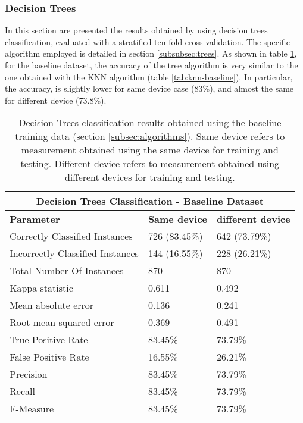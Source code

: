 \subsubsection{Decision Trees}
\label{test-trees}
In this section are presented the results obtained by using decision trees classification, evaluated with a stratified ten-fold cross validation. The specific algorithm employed is detailed in section \ref{subsubsec:trees}. As shown in table \ref{tab:tree-baseline}, for the baseline dataset, the accuracy of the tree algorithm is very similar to the one obtained with the KNN algorithm (table \ref{tab:knn-baseline}). In particular, the accuracy, is slightly lower for same device case (83\%), and almost the same for different device (73.8\%).


\begin{table}
\center
\caption[Decision Trees classification results obtained using the baseline training data.]{Decision Trees classification results obtained using the baseline training data (section \ref{subsec:algorithms}). Same device refers to measurement obtained using the same device for training and testing. Different device refers to measurement obtained using different devices for training and testing.}
\label{tab:tree-baseline}
\begin{tabular}{ |l|l|l| }
  \hline
  \multicolumn{3}{|c|}{\textbf{Decision Trees Classification - Baseline Dataset}} \\
  \hline
  \textbf{Parameter} & \textbf{Same device} & \textbf{different device}\\
  \hline
  Correctly Classified Instances & 726 (83.45\%) & 642 (73.79\%) \\
  Incorrectly Classified Instances & 144 (16.55\%) & 228 (26.21\%) \\
  Total Number Of Instances & 870 & 870 \\
  Kappa statistic & 0.611 & 0.492 \\
  Mean absolute error & 0.136 & 0.241 \\
  Root mean squared error & 0.369 & 0.491 \\
  True Positive Rate & 83.45\% & 73.79\% \\
  False Positive Rate & 16.55\% & 26.21\% \\
  Precision & 83.45\% & 73.79\% \\
  Recall & 83.45\% & 73.79\% \\
  F-Measure & 83.45\% & 73.79\% \\
  \hline
\end{tabular}
\end{table}

